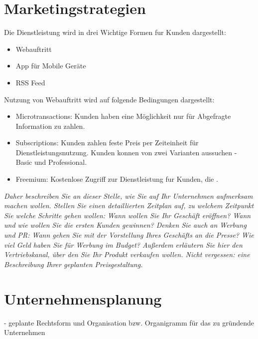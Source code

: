\documentclass[12pt, a4paper]{article} %
\begin{document}
\newpage


\section{Marketingstrategien}

Die Dienstleistung wird in drei Wichtige Formen fur Kunden dargestellt:
\begin{itemize}
\item Webauftritt
\item App für Mobile Geräte
\item RSS Feed
\end{itemize}



Nutzung von Webauftritt wird auf folgende Bedingungen dargestellt:
\begin{itemize}
\item Microtransactions: Kunden haben eine Möglichkeit nur für Abgefragte Information zu zahlen. 

\item Subscriptions: Kunden zahlen feste Preis per Zeiteinheit für Dienstleistungsnutzung. Kunden konnen von zwei Varianten aussuchen - Basic und Professional.

\item Freemium: Kostenlose Zugriff zur Dienstleistung fur Kunden, die .
\end{itemize}



\emph{Daher beschreiben Sie an dieser Stelle, wie Sie auf Ihr Unternehmen aufmerksam machen wollen. Stellen Sie einen detaillierten Zeitplan auf, zu welchem Zeitpunkt Sie welche Schritte gehen wollen: Wann wollen Sie Ihr Geschäft eröffnen? Wann und wie wollen Sie die ersten Kunden gewinnen? Denken Sie auch an Werbung und PR: Wann gehen Sie mit der Vorstellung Ihres Geschäfts an die Presse? Wie viel Geld haben Sie für Werbung im Budget? Außerdem erläutern Sie hier den Vertriebskanal, über den Sie Ihr Produkt verkaufen wollen. Nicht vergessen: eine Beschreibung Ihrer geplanten Preisgestaltung.}


\newpage


\section{Unternehmensplanung}
- geplante Rechtsform und Organisation bzw. Organigramm für das zu gründende Unternehmen
\end{document}

